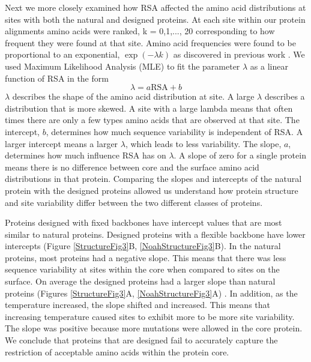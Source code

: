 \documentclass[12pt]{article}
\begin{document}
{Next we more closely examined how RSA affected the amino acid distributions at sites with both the natural and designed proteins. At each site within our protein alignments amino acids were ranked, k = 0,1,..., 20 corresponding to how frequent they were found at that site. Amino acid frequencies were found to be proportional to an exponential, $\exp (-\lambda k)$ as discovered in previous work \cite{Ramsey2011}. We used Maximum Likelihood Analysis (MLE) to fit the parameter $\lambda$ as a linear function of RSA in the form $$ \lambda = a \text{RSA} + b $$ $\lambda$ describes the shape of the amino acid distribution at site. A large $\lambda$ describes a distribution that is more skewed. A site with a large lambda means that often times there are only a few types amino acids that are observed at that site. The intercept, $b$, determines how much sequence variability is independent of RSA. A larger intercept means a larger $\lambda$, which leads to less variability. The slope, $a$, determines how much influence RSA has on $\lambda$. A slope of zero for a single protein means there is no difference between core and the surface amino acid distributions in that protein. Comparing the slopes and intercepts of the natural protein with the designed proteins allowed us understand how protein structure and site variability differ between the two different classes of proteins. 

Proteins designed with fixed backbones have intercept values that are most similar to natural proteins. Designed proteins with a flexible backbone have lower intercepts (Figure \ref{StructureFig3}B, \ref{NoahStructureFig3}B). In the natural proteins, most proteins had a negative slope. This means that there was less sequence variability at sites within the core when compared to sites on the surface.  On average the designed proteins had a larger slope than natural proteins (Figures \ref{StructureFig3}A, \ref{NoahStructureFig3}A) . In addition, as the temperature increased, the slope shifted and increased. This means that increasing temperature caused sites to exhibit more to be more site variability. The slope was positive because more mutations were allowed in the core protein. We conclude that proteins that are designed fail to accurately capture the restriction of acceptable amino acids within the protein core. 


}
\end{document}
